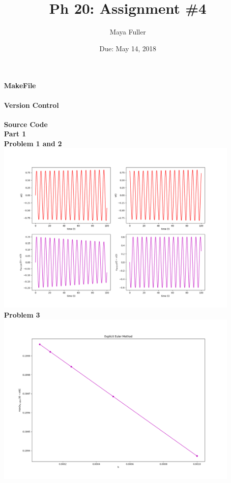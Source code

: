 \documentclass[12pt]{article}
\title{Ph 20: Assignment \#4}
\author{Maya Fuller}
\date{Due: May 14, 2018} %
\begin{document}
	
	
	\maketitle

	\noindent\textbf{\large MakeFile}\\
	\\
	
	\noindent\textbf{\large Version Control}\\
	\\
	
	\noindent\textbf{\large Source Code}\\
	
	
	\noindent\textbf{\large Part 1}\\
	
	\indent\textbf{Problem 1 and 2}\\
		\includegraphics[width=0.9\textwidth]{vstimePlots.png}\\
		
	\indent\textbf{Problem 3}\\
		\includegraphics[width=0.9\textwidth]{errorPlot.png}\\
		
\end{document}
